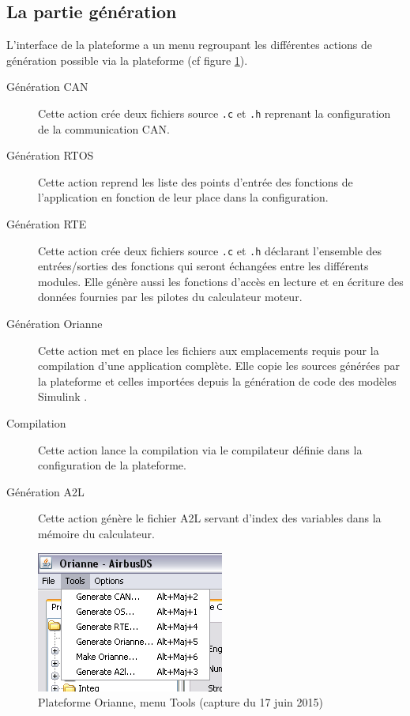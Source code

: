 \subsection{La partie génération}
L'interface de la plateforme a un menu regroupant les différentes actions de génération possible via la plateforme (cf figure \ref{fig:toolsMenu}).
\begin{description}
  \item[Génération CAN] Cette action crée deux fichiers source {\tt.c} et {\tt .h} reprenant la configuration de la communication CAN.
  \item[Génération RTOS] Cette action reprend les liste des points d'entrée des fonctions de l'application en fonction de leur place dans la configuration.
  \item[Génération RTE] Cette action crée deux fichiers source {\tt.c} et {\tt .h} déclarant l'ensemble des entrées/sorties des fonctions qui seront échangées entre les différents modules. Elle génère aussi les fonctions d'accès en lecture et en écriture des données fournies par les pilotes du calculateur moteur.
  \item[Génération Orianne] Cette action met en place les fichiers aux emplacements requis pour la compilation d'une application complète. Elle copie les sources générées par la plateforme et celles importées depuis la génération de code des modèles Simulink \up{\circledR}.
  \item[Compilation] Cette action lance la compilation via le compilateur définie dans la configuration de la plateforme.
  \item[Génération A2L] Cette action génère le fichier A2L servant d'index des variables dans la mémoire du calculateur.
\end{description}

\begin{figure}[h]
  \centering
  \includegraphics[scale=0.7]{images/toolsMenu}
  \caption{Plateforme Orianne, menu Tools (capture du 17 juin 2015)}
  \label{fig:toolsMenu}
\end{figure}

